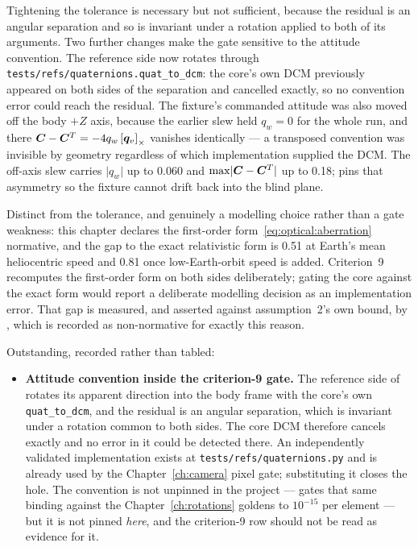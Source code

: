 Tightening the tolerance is necessary but not sufficient, because the
residual is an angular separation and so is invariant under a rotation
applied to both of its arguments. Two further changes make the gate
sensitive to the attitude convention. The reference side now rotates
through \texttt{tests/refs/quaternions.quat\_to\_dcm}: the core's own DCM
previously appeared on both sides of the separation and cancelled exactly,
so no convention error could reach the residual. The fixture's commanded
attitude was also moved off the body $+Z$ axis, because the earlier slew
held $q_w = 0$ for the whole run, and there
$\bm{C} - \bm{C}^{T} = -4 q_w \left[\bm{q}_v\right]_{\times}$ vanishes identically ---
a transposed convention was invisible by geometry regardless of which
implementation supplied the DCM. The off-axis slew carries
$\lvert q_w \rvert$ up to \num{0.060} and
$\max \lvert \bm{C} - \bm{C}^{T} \rvert$ up to \num{0.18};
 pins
that asymmetry so the fixture cannot drift back into the blind plane.

Distinct from the tolerance, and genuinely a modelling choice rather than a
gate weakness: this chapter declares the first-order
form~\eqref{eq:optical:aberration} normative, and the gap to the exact
relativistic form is \qty{0.51}{\mas} at Earth's mean heliocentric speed
and \qty{0.81}{\mas} once low-Earth-orbit speed is added. Criterion~9
recomputes the first-order form on both sides deliberately; gating the core
against the exact form would report a deliberate modelling decision as an
implementation error. That gap is measured, and asserted against
assumption~2's own bound, by
, which is recorded
as non-normative for exactly this reason.

Outstanding, recorded rather than tabled:
\begin{itemize}
  \item \textbf{Attitude convention inside the criterion-9 gate.} The
    reference side of 
    rotates its apparent direction into the body frame with the core's own
    \texttt{quat\_to\_dcm}, and the residual is an angular separation, which
    is invariant under a rotation common to both sides. The core DCM
    therefore cancels exactly and no error in it could be detected there.
    An independently validated implementation exists at
    \texttt{tests/refs/quaternions.py} and is already used by the
    Chapter~\ref{ch:camera} pixel gate; substituting it closes the hole.
    The convention is not unpinned in the project ---
     gates that same binding
    against the Chapter~\ref{ch:rotations} goldens to $10^{-15}$ per
    element --- but it is not pinned \emph{here}, and the criterion-9 row
    should not be read as evidence for it.
\end{itemize}

